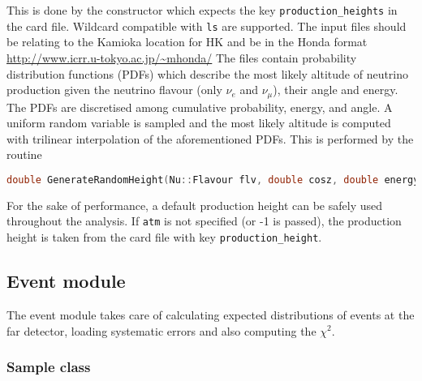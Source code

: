 \documentclass[a4paper, 11pt]{article}
\begin{document}
This is done by the constructor which expects the key \texttt{production\_heights} in the card file.
Wildcard compatible with \texttt{ls} are supported.
The input files should be relating to the Kamioka location for HK and be in the Honda format \url{http://www.icrr.u-tokyo.ac.jp/~mhonda/}
The files contain probability distribution functions (PDFs) which describe the most likely altitude of neutrino production given %
the neutrino flavour (only $\nu_e$ and $\nu_\mu$), their angle and energy.
The PDFs are discretised among cumulative probability, energy, and angle.
A uniform random variable is sampled and the most likely altitude is computed with trilinear interpolation of the aforementioned PDFs.
This is performed by the routine 
\begin{lstlisting}[language=C++]
    double GenerateRandomHeight(Nu::Flavour flv, double cosz, double energy);
\end{lstlisting}
For the sake of performance, a default production height can be safely used throughout the analysis.
If \texttt{atm} is not specified (or -1 is passed), the production height is taken from the card file %
with key \texttt{production\_height}.


\subsection{Event module}
\label{sec:event}

The event module takes care of calculating expected distributions of events at the far detector, %
loading systematic errors and also computing the $\chi^2$.

\subsubsection{Sample class}
\label{sec:sample}
\end{document}
